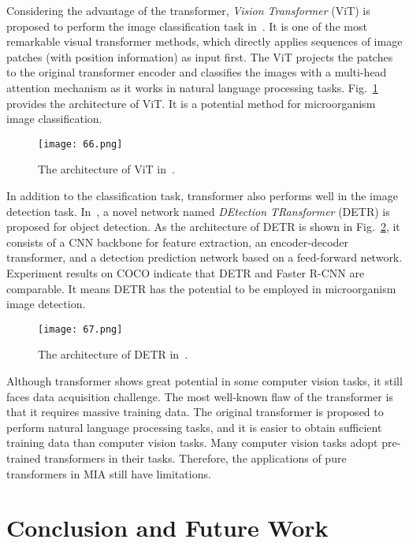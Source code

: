 Considering the advantage of the transformer, \emph{Vision Transformer} (ViT) is proposed to perform the image classification task in~\cite{Dosovitskiy-2020-AIIW}. It is one of the most remarkable visual transformer methods, which directly applies sequences of image patches (with position information) as input first. The ViT projects the patches to the original transformer encoder and classifies the images with a multi-head attention mechanism as it works in natural language processing tasks. Fig.~\ref{fig66} provides the architecture of ViT. It is a potential method for microorganism image classification.

\begin{figure}[htbp!]
\centering
\texttt{[image: 66.png]}
\caption{The architecture of ViT in~\cite{Dosovitskiy-2020-AIIW}.}
\label{fig66}
\end{figure}

In addition to the classification task, transformer also performs well in the image detection task. In~\cite{Carion-2020-EODT}, a novel network named \emph{DEtection TRansformer} (DETR) is proposed for object detection. As the architecture of DETR is shown in Fig.~\ref{fig67}, it consists of a CNN backbone for feature extraction, an encoder-decoder transformer, and a detection prediction network based on a feed-forward network. Experiment results on COCO indicate that DETR and Faster R-CNN are comparable. It means DETR has the potential to be employed in microorganism image detection.

\begin{figure}[htbp!]
\centering
\texttt{[image: 67.png]}
\caption{The architecture of DETR in~\cite{Carion-2020-EODT}.}
\label{fig67}
\end{figure}

Although transformer shows great potential in some computer vision tasks, it still faces data acquisition challenge. The most well-known flaw of the transformer is that it requires massive training data. The original transformer is proposed to perform natural language processing tasks, and it is easier to obtain sufficient training data than computer vision tasks. Many computer vision tasks adopt pre-trained transformers in their tasks. Therefore, the applications of pure transformers in MIA still have limitations.

\section{Conclusion and Future Work}
\label{CFW}


